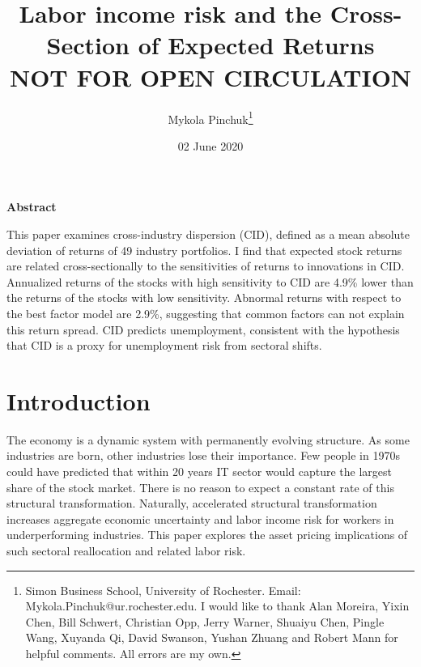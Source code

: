 \documentclass[12pt]{article}
\begin{document}
\onehalfspacing      %
\renewcommand{\footnote}{\endnote}  %

\author{\large{Mykola Pinchuk}\thanks{\rm Simon Business School, University of Rochester. Email: Mykola.Pinchuk@ur.rochester.edu. \newline I would like to thank Alan Moreira, Yixin Chen, Bill Schwert, Christian Opp, Jerry Warner, Shuaiyu Chen, Pingle Wang, Xuyanda Qi, David Swanson, Yushan Zhuang and Robert Mann for helpful comments. All errors are my own.}}

\title{\bf Labor income risk and the Cross-Section of Expected Returns \\
NOT FOR OPEN CIRCULATION}

\date{02 June 2020}  

\maketitle
\thispagestyle{empty}

\bigskip

\normalsize
\vspace{1cm}

\centerline{\bf Abstract}

\vspace{0.5cm}

\begin{onehalfspace}  %
  \noindent This paper examines cross-industry dispersion (CID), defined as a mean absolute deviation of returns of 49 industry portfolios. I find that expected stock returns are related cross-sectionally to the sensitivities of returns to innovations in CID. Annualized returns of the stocks with high sensitivity to CID are 4.9\% lower than the returns of the stocks with low sensitivity. Abnormal returns with respect to the best factor model are 2.9\%, suggesting that common factors can not explain this return spread. CID predicts unemployment, consistent with the hypothesis that CID is a proxy for unemployment risk from sectoral shifts. 
\end{onehalfspace}
\medskip


\clearpage
{}


\section{Introduction} \label{sec:Model}
The economy is a dynamic system with permanently evolving structure. As some industries are born, other industries lose their importance. Few people in 1970s could have predicted that within 20 years IT sector would capture the largest share of the stock market. There is no reason to expect a constant rate of this structural transformation. Naturally, accelerated structural transformation increases aggregate economic uncertainty and labor income risk for workers in underperforming industries. This paper explores the asset pricing implications of such sectoral reallocation and related labor risk.
\end{document}
